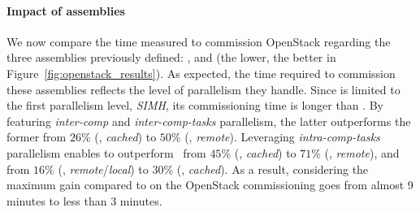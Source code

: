 \paragraph{Impact of assemblies}

We now compare the time measured to commission OpenStack regarding the
three assemblies previously defined: \ansass, \aeoass and \madass (the
lower, the better in Figure~\ref{fig:openstack_results}).  As
expected, the time required to commission these assemblies reflects
the level of parallelism they handle. Since \ansass is limited to the
first parallelism level, \ie \emph{SIMH}, its commissioning time is
longer than \aeoass. By featuring \emph{inter-comp} and
\emph{inter-comp-tasks} parallelism, the latter outperforms the former
from $26$\% (\nova, \emph{cached}) to $50$\% (\ecotype,
\emph{remote}). Leveraging \emph{intra-comp-tasks} parallelism enables
\madass to outperform \ansass~from $45$\% (\nova, \emph{cached}) to
$71$\% (\ecotype, \emph{remote}), and \aeoass from $16$\% (\nova,
\emph{remote}/\emph{local}) to $30$\% (\ecotype, \emph{cached}). As a
result, considering the maximum gain compared to \ansass on \ecotype
the OpenStack commissioning goes from almost 9 minutes to less than 3
minutes.
%

